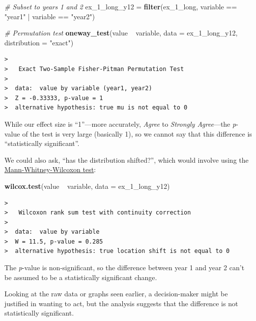 \documentclass[]{book}
\newenvironment{Shaded}{\begin{snugshade}}{\end{snugshade}}
\newcommand{\KeywordTok}[1]{\textcolor[rgb]{0.13,0.29,0.53}{\textbf{{#1}}}}
\newcommand{\DataTypeTok}[1]{\textcolor[rgb]{0.13,0.29,0.53}{{#1}}}
\newcommand{\StringTok}[1]{\textcolor[rgb]{0.31,0.60,0.02}{{#1}}}
\newcommand{\CommentTok}[1]{\textcolor[rgb]{0.56,0.35,0.01}{\textit{{#1}}}}
\newcommand{\NormalTok}[1]{{#1}}
\begin{document}
\begin{Shaded}
\begin{Highlighting}[]
\CommentTok{# Subset to years 1 and 2}
\NormalTok{ex_1_long_y12 =}\StringTok{ }\KeywordTok{filter}\NormalTok{(ex_1_long, variable ==}\StringTok{ "year1"} \NormalTok{|}\StringTok{ }\NormalTok{variable ==}\StringTok{ "year2"}\NormalTok{)}

\CommentTok{# Permutation test}
\KeywordTok{oneway_test}\NormalTok{(value ~}\StringTok{ }\NormalTok{variable, }\DataTypeTok{data =} \NormalTok{ex_1_long_y12, }\DataTypeTok{distribution =} \StringTok{"exact"}\NormalTok{)}
\end{Highlighting}
\end{Shaded}

\begin{verbatim}
>  
>   Exact Two-Sample Fisher-Pitman Permutation Test
>  
>  data:  value by variable (year1, year2)
>  Z = -0.33333, p-value = 1
>  alternative hypothesis: true mu is not equal to 0
\end{verbatim}

While our effect size is ``1''---more accurately, \emph{Agree} to
\emph{Strongly Agree}---the \emph{p}-value of the test is very large
(basically 1), so we cannot say that this difference is ``statistically
significant''.

We could also ask, ``has the distribution shifted?'', which would
involve using the
\href{https://en.wikipedia.org/wiki/Mann\%E2\%80\%93Whitney_U_test}{Mann-Whitney-Wilcoxon
test}:

\begin{Shaded}
\begin{Highlighting}[]
\KeywordTok{wilcox.test}\NormalTok{(value ~}\StringTok{ }\NormalTok{variable, }\DataTypeTok{data =} \NormalTok{ex_1_long_y12) }
\end{Highlighting}
\end{Shaded}

\begin{verbatim}
>  
>   Wilcoxon rank sum test with continuity correction
>  
>  data:  value by variable
>  W = 11.5, p-value = 0.285
>  alternative hypothesis: true location shift is not equal to 0
\end{verbatim}

The \emph{p}-value is non-significant, so the difference between year 1
and year 2 can't be assumed to be a statistically significant change.

Looking at the raw data or graphs seen earlier, a decision-maker might
be justified in wanting to act, but the analysis suggests that the
difference is not statistically significant.
\end{document}
